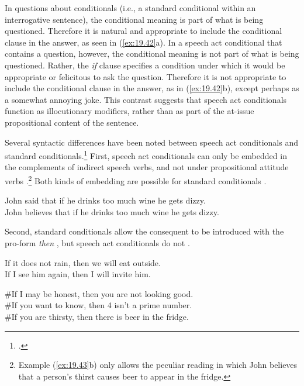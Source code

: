 In questions about conditionals (i.e., a standard conditional within an interrogative sentence), the conditional meaning is part of what is being questioned. Therefore it is natural and appropriate to include the conditional clause in the answer, as seen in (\ref{ex:19.42}a). In a speech act conditional that contains a question, however, the conditional meaning is not part of what is being questioned. Rather, the \textit{if} clause specifies a condition under which it would be appropriate or felicitous to ask the question. Therefore it is not appropriate to include the conditional clause in the answer, as in (\ref{ex:19.42}b), except perhaps as a somewhat annoying joke. This contrast suggests that speech act conditionals function as illocutionary modifiers, rather than as part of the at-issue propositional content of the sentence.


Several syntactic differences have been noted between speech act conditionals and standard conditionals.\footnote{\citet{BhattPancheva2006}.} First, speech act conditionals can only be embedded in the complements of indirect speech verbs, and not under propositional attitude verbs .\footnote{Example (\ref{ex:19.43}b) only allows the peculiar reading in which John believes that a person's thirst causes beer to appear in the fridge.} Both kinds of embedding are possible for standard conditionals .


\ea \label{ex:19.43}
                       \z
\z

\ea \label{ex:19.44}
\ea  John said that if he drinks too much wine he gets dizzy.\\
\ex John believes that if he drinks too much wine he gets dizzy.
                       \z
\z


Second, standard conditionals allow the consequent to be introduced with the pro-form \textit{then} , but speech act conditionals do not .


\ea \label{ex:19.45}
\ea  If it does not rain, then we will eat outside.\\
\ex If I see him again, then I will invite him.
                       \z
\z

\ea \label{ex:19.46}
\ea \#If I may be honest, then you are not looking good.\\
\ex \#If you want to know, then 4 isn’t a prime number.\\
\ex \#If you are thirsty, then there is beer in the fridge.
                       \z
\z


